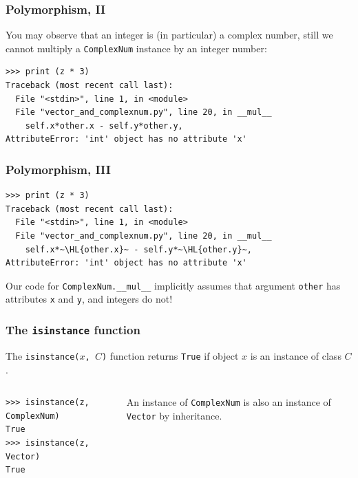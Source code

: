 \documentclass[english,serif,mathserif,xcolor=pdftex,dvipsnames,table]{beamer}
\begin{document}
\begin{frame}[fragile]
  \frametitle{Polymorphism, II}

  You may observe that an integer is (in particular) a complex number,
  still we cannot multiply a \texttt{ComplexNum} instance by an
  integer number:
\begin{lstlisting}
>>> print (z * 3)
Traceback (most recent call last):
  File "<stdin>", line 1, in <module>
  File "vector_and_complexnum.py", line 20, in __mul__
    self.x*other.x - self.y*other.y,
AttributeError: 'int' object has no attribute 'x'
\end{lstlisting}

\end{frame}


\begin{frame}[fragile]
  \frametitle{Polymorphism, III}

\begin{lstlisting}
>>> print (z * 3)
Traceback (most recent call last):
  File "<stdin>", line 1, in <module>
  File "vector_and_complexnum.py", line 20, in __mul__
    self.x*~\HL{other.x}~ - self.y*~\HL{other.y}~,
AttributeError: 'int' object has no attribute 'x'
\end{lstlisting}

  \+ Our code for \lstinline|ComplexNum.__mul__| implicitly assumes
  that argument \lstinline|other| has attributes \texttt{x} and
  \texttt{y}, and integers do not!
\end{frame}


\begin{frame}[fragile]
  \frametitle{The \texttt{isinstance} function}
  The \texttt{isinstance($x$, $C$)} function returns \texttt{True} if
  object $x$ is an instance of class $C$.

  \+
  \begin{columns}
    \begin{column}{0.5\textwidth}
\begin{lstlisting}
>>> isinstance(z, ComplexNum)
True
>>> isinstance(z, Vector)
True
\end{lstlisting}
    \end{column}
    \begin{column}{0.4\textwidth}
      \raggedleft
      An instance of \texttt{ComplexNum} is also an instance of
      \texttt{Vector} by inheritance.
    \end{column}
  \end{columns}
\end{frame}
\end{document}
